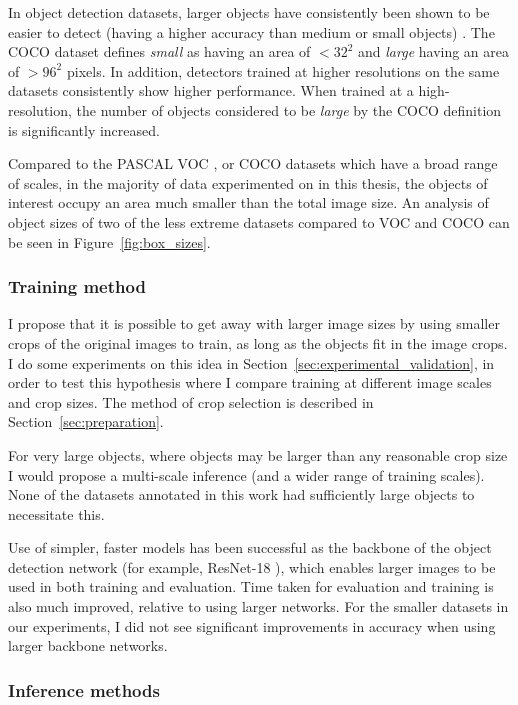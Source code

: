 In object detection datasets, larger objects have consistently been shown to be easier to detect (having a higher accuracy than medium or small objects) \cite{Lin2014, Wang2017, Lin2017a, Law2018, Zhou2019}. The COCO dataset defines \emph{small} as having an area of $<32^2$ and \emph{large} having an area of $>96^2$ pixels. In addition, detectors trained at higher resolutions on the same datasets consistently show higher performance. When trained at a high-resolution, the number of objects considered to be \emph{large} by the COCO definition is significantly increased.

 Compared to the PASCAL VOC \cite{Everingham2008}, or COCO \cite{Lin2014} datasets which have a broad range of scales, in the majority of data experimented on in this thesis, the objects of interest occupy an area much smaller than the total image size. An analysis of object sizes of two of the less extreme datasets compared to VOC and COCO can be seen in Figure~\ref{fig:box_sizes}. 
 
\subsubsection {Training method}
\label{sec:highres_inference}
 
I propose that it is possible to get away with larger image sizes by using smaller crops of the original images to train, as long as the objects fit in the image crops. I do some experiments on this idea in Section~\ref{sec:experimental_validation}, in order to test this hypothesis where I compare training at different image scales and crop sizes. The method of crop selection is described in Section~\ref{sec:preparation}. 

For very large objects, where objects may be larger than any reasonable crop size I would propose a multi-scale inference (and a wider range of training scales). None of the datasets annotated in this work had sufficiently large objects to necessitate this.

Use of simpler, faster models has been successful as the backbone of the object detection network (for example, ResNet-18 \cite{He}), which enables larger images to be used in both training and evaluation. Time taken for evaluation and training is also much improved, relative to using larger networks. For the smaller datasets in our experiments, I did not see significant improvements in accuracy when using larger backbone networks.


\subsubsection{Inference methods}

